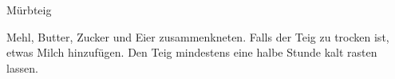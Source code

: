 \begin{recipe}{Mürbteig}
    \label{murbteig}%

    \begin{ingredients}
    \end{ingredients}

    \begin{instructions}
        Mehl, Butter, Zucker und Eier zusammenkneten.
        Falls der Teig zu trocken ist, etwas Milch hinzufügen.
        Den Teig mindestens eine halbe Stunde kalt rasten lassen.
    \end{instructions}
\end{recipe}
